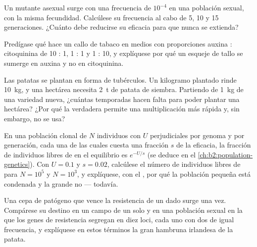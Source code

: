 \begin{exercise}[$\star\star$]\label{exo:b2:asexual-reproduction:7}
Un mutante asexual surge con una frecuencia de $10^{-4}$ en una población
sexual, con la misma fecundidad. Calcúlese su frecuencia al cabo de 5,
10 y 15 generaciones. ¿Cuánto debe reducirse su eficacia para que nunca
se extienda?
\end{exercise}

\begin{exercise}[$\star\star$]\label{exo:b2:asexual-reproduction:8}
Predígase qué hace un callo de tabaco en medios con proporciones auxina :
citoquinina de 10 : 1, 1 : 1 y 1 : 10, y explíquese por qué un esqueje
de tallo se sumerge en auxina y no en citoquinina.
\end{exercise}

\begin{exercise}[$\star\star$]\label{exo:b2:asexual-reproduction:9}
Las patatas se plantan en forma de tubérculos. Un kilogramo plantado
rinde \qty{10}{kg}, y una hectárea necesita \qty{2}{t} de patata de
siembra. Partiendo de \qty{1}{kg} de una variedad nueva, ¿cuántas
temporadas hacen falta para poder plantar una hectárea? ¿Por qué la
 verdadera permite una multiplicación más rápida y, sin embargo,
no se usa?
\end{exercise}

\begin{exercise}[$\star\star\star$]\label{exo:b2:asexual-reproduction:10}
En una población clonal de $N$ individuos con $U$  perjudiciales
por genoma y por generación, cada una de las cuales cuesta una fracción
$s$ de la eficacia, la fracción de individuos libres de  en el
equilibrio es
$e^{-U/s}$ (se deduce en el \cref{ch:b2:population-genetics}). Con $U =
0.1$ y $s = 0.02$, calcúlese el número de individuos libres de 
para $N = 10^{5}$ y $N = 10^{3}$, y explíquese, con el , por qué la población pequeña está condenada y la grande no ---
todavía.
\end{exercise}

\begin{exercise}[$\star\star\star$]\label{exo:b2:asexual-reproduction:11}
Una cepa de patógeno que vence la resistencia de un  dado surge
una vez. Compárese su destino en un campo de un solo  y en una
población sexual en la que los genes de resistencia segregan en diez
loci, cada uno con dos  de igual frecuencia, y explíquese en estos
términos la gran hambruna irlandesa de la patata.
\end{exercise}

